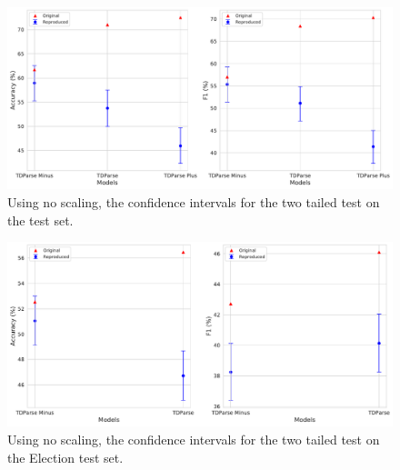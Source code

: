 \begin{figure}[!h]
    \centering
    \includegraphics[scale=0.37]{images/reproducibility/wang/TDParse_no_scale_Dong.pdf}
    \caption{Using no scaling, the confidence intervals for the two tailed test on the \citet{dong-etal-2014-adaptive} test set.}
    \label{fig:repro_wang_TDParse_Dong_no_scale}
\end{figure}
\begin{figure}[!h]
    \centering
    \includegraphics[scale=0.37]{images/reproducibility/wang/TDParse_no_scale_Election.pdf}
    \caption{Using no scaling, the confidence intervals for the two tailed test on the \citet{wang-etal-2017-tdparse} Election test set.}
    \label{fig:repro_wang_TDParse_Election_no_scale}
\end{figure}

